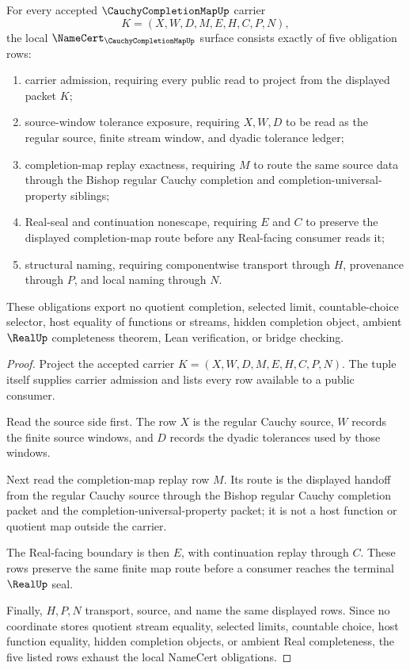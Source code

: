 \begin{theorem}
\label{thm:cauchy-completion-map-namecert-obligations}
For every accepted $\CauchyCompletionMapUp$ carrier
$$
K=(X,W,D,M,E,H,C,P,N),
$$
the local $\NameCert_{\CauchyCompletionMapUp}$ surface consists exactly of five obligation rows:
\begin{enumerate}
\item carrier admission, requiring every public read to project from the displayed packet $K$;
\item source-window tolerance exposure, requiring $X,W,D$ to be read as the regular source, finite stream window, and dyadic tolerance ledger;
\item completion-map replay exactness, requiring $M$ to route the same source data through the Bishop regular Cauchy completion and completion-universal-property siblings;
\item Real-seal and continuation nonescape, requiring $E$ and $C$ to preserve the displayed completion-map route before any Real-facing consumer reads it;
\item structural naming, requiring componentwise transport through $H$, provenance through $P$, and local naming through $N$.
\end{enumerate}
These obligations export no quotient completion, selected limit, countable-choice selector, host equality of functions or streams, hidden completion object, ambient $\RealUp$ completeness theorem, Lean verification, or bridge checking.
\end{theorem}
\begin{proof}
Project the accepted carrier $K=(X,W,D,M,E,H,C,P,N)$. The tuple itself supplies carrier admission and lists every row available to a public consumer.

Read the source side first. The row $X$ is the regular Cauchy source, $W$ records the finite source windows, and $D$ records the dyadic tolerances used by those windows.

Next read the completion-map replay row $M$. Its route is the displayed handoff from the regular Cauchy source through the Bishop regular Cauchy completion packet and the completion-universal-property packet; it is not a host function or quotient map outside the carrier.

The Real-facing boundary is then $E$, with continuation replay through $C$. These rows preserve the same finite map route before a consumer reaches the terminal $\RealUp$ seal.

Finally, $H,P,N$ transport, source, and name the same displayed rows. Since no coordinate stores quotient stream equality, selected limits, countable choice, host function equality, hidden completion objects, or ambient Real completeness, the five listed rows exhaust the local NameCert obligations.
\end{proof}

